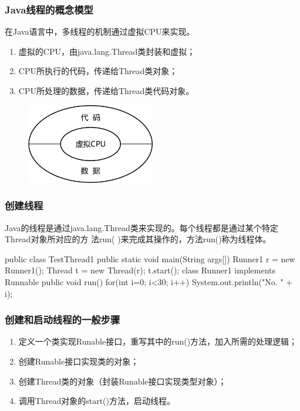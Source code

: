 \documentclass[compress,table]{beamer} %
\newcommand{\kai}{\CJKfamily{KaiTi}}
\begin{document}
\begin{frame}[fragile] %
\frametitle{Java线程的概念模型}

在Java语言中，多线程的机制通过虚拟CPU来实现。

\begin{enumerate}\kai
\item 虚拟的CPU，由java.lang.Thread类封装和虚拟；
\item CPU所执行的代码，传递给Thread类对象；
\item CPU所处理的数据，传递给Thread类代码对象。
\end{enumerate}
\begin{figure}
\centering
\includegraphics[width=0.5\textwidth]{virtual-cpu.pdf}
\end{figure}
\end{frame}

\begin{frame}[fragile] %
\frametitle{创建线程}

Java的线程是通过java.lang.Thread类来实现的。每个线程都是通过某个特定Thread对象所对应的方
法run( )来完成其操作的，方法run()称为线程体。

\begin{javaCode}
public class TestThread1 {
  public static void main(String args[]) {
    Runner1 r = new Runner1();
    Thread t = new Thread(r);
    t.start();
  }
}
class Runner1 implements Runnable {
  public void run() {
    for(int i=0; i<30; i++) {
      System.out.println("No. " + i);
    }
  }
}
\end{javaCode}
\end{frame}

\begin{frame}[fragile] %
\frametitle{创建和启动线程的一般步骤}
\begin{enumerate}
\item 定义一个类实现Runable接口，重写其中的run()方法，加入所需的处理逻辑；
\item 创建Runable接口实现类的对象；
\item 创建Thread类的对象（封装Runable接口实现类型对象）；
\item 调用Thread对象的start()方法，启动线程。
\end{enumerate}
\end{frame}
\end{document}
